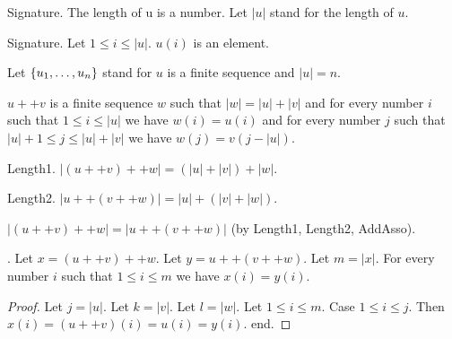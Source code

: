 Signature. The length of u is a number.
Let $|u|$ stand for the length of $u$.

Signature. Let $1 \leq i \leq |u|$. $u(i)$ is an element.

Let $\{u_{1},\dots,u_{n}\}$ stand for $u$ is a finite sequence and $|u| = n$.

\begin{signaturep}
$u ++ v$ is a finite sequence $w$ such that
$|w| = |u| + |v|$
and for every number $i$ such that $1 \leq i \leq |u|$ we have 
$w(i) = u(i)$
and for every number $j$ such that 
$|u|+1 \leq j \leq |u|+|v|$ we have 
$w(j) = v(j-|u|)$.
\end{signaturep}

\begin{lemma} Length1.
$|(u++v)++w| = (|u|+|v|)+|w|$.
\end{lemma}

\begin{lemma} Length2.
$|u++(v++w)| = |u|+(|v|+|w|)$.
\end{lemma}

\begin{lemmap}
$|(u++v)++w| = |u++(v++w)|$ (by Length1, Length2, AddAsso).
\end{lemmap}

\begin{lemma}.
Let $x = (u++v)++w$. Let $y = u++(v++w)$. 
Let $m = |x|$.
For every number $i$ such that $1 \leq i \leq m$ we have
$x(i)=y(i)$.
\end{lemma}
\begin{proof}
Let $j = |u|$. Let $k = |v|$. Let $l = |w|$.
Let $1 \leq i \leq m$.
Case $1 \leq i \leq j$.
Then
$x(i) = (u++v)(i) = u(i) = y(i)$. end.
\end{proof}


